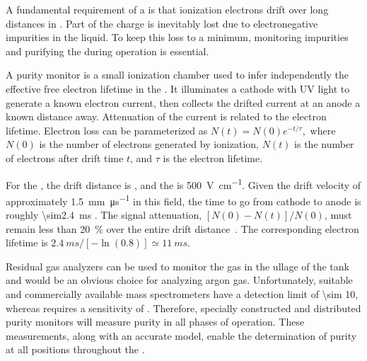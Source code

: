 A fundamental requirement of a   is that ionization electrons drift over long distances in . Part of the charge is inevitably lost due to electronegative impurities in the liquid. To keep this loss to a minimum, monitoring impurities and purifying the  during operation is essential.


A purity monitor is a small ionization chamber used to infer independently  the effective free electron lifetime in the .  
It illuminates a cathode with UV light to generate a known electron current, then collects the drifted current at an anode a known distance away.  Attenuation of the current is related to the electron lifetime.
Electron loss can be parameterized as
%
\(N(t) = N(0)e^{-t/\tau},\)
%
where $N(0)$ is the number of electrons generated by ionization, $N(t)$ is the number of electrons after drift time $t$, and $\tau$ is the electron lifetime. 


For the , the drift distance is \spmaxdrift, and the \efield is \SI{500}{\volt\per\centi\meter}. Given the drift velocity of approximately \SI{1.5}{\milli\meter\per\micro\second} in this field, the time to go from cathode to anode is roughly \SI{\sim2.4}{\milli\second} \cite{Walkowiak:2000wf}.
The  signal attenuation, \([N(0)-N(t)]/N(0)\), must remain %
less than \SI{20}{\percent} over the entire drift distance~\cite{bib:docdb3384}.  %
 The corresponding electron lifetime is $\SI{2.4}{ms}/[-\ln(0.8)] \simeq \SI{11}{ms}$.


Residual gas analyzers can be used to monitor the gas in the ullage of the tank and would be an obvious choice for analyzing argon gas. 
Unfortunately, suitable and commercially available mass
spectrometers have a detection limit of \SI{\sim 10}{},
whereas  requires a sensitivity of . Therefore,
specially constructed and distributed purity monitors will measure  purity in all %
phases of operation. %
These measurements,
along with an accurate  model, enable the
determination of purity at all positions throughout the .



